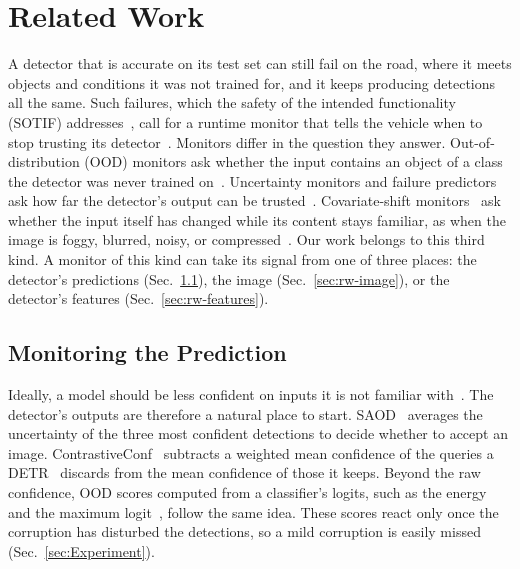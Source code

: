 \section{Related Work}
\label{sec:Related Work}

A detector that is accurate on its test set can still fail on the road, where it meets objects and conditions it was not trained for, and it keeps producing detections all the same. Such failures, which the safety of the intended functionality (SOTIF) addresses~\cite{iso21448}, call for a runtime monitor that tells the vehicle when to stop trusting its detector~\cite{rahman2021survey,yatbaz2024survey}. Monitors differ in the question they answer. Out-of-distribution (OOD) monitors ask whether the input contains an object of a class the detector was never trained on~\cite{du2022vos,du2022siren}. Uncertainty monitors and failure predictors ask how far the detector's output can be trusted~\cite{feng2022review,harakeh2021estimating,rahman2021perframe,yatbaz2024runtime}. Covariate-shift monitors~\cite{yang2024generalized} ask whether the input itself has changed while its content stays familiar, as when the image is foggy, blurred, noisy, or compressed~\cite{hendrycks2019benchmarking,michaelis2019benchmarking}. Our work belongs to this third kind. A monitor of this kind can take its signal from one of three places: the detector's predictions (Sec.~\ref{sec:rw-prediction}), the image (Sec.~\ref{sec:rw-image}), or the detector's features (Sec.~\ref{sec:rw-features}).

\subsection{Monitoring the Prediction}
\label{sec:rw-prediction}
Ideally, a model should be less confident on inputs it is not familiar with~\cite{hendrycks2017baseline}. The detector's outputs are therefore a natural place to start. SAOD~\cite{oksuz2023saod} averages the uncertainty of the three most confident detections to decide whether to accept an image. ContrastiveConf~\cite{park2026uncertainty} subtracts a weighted mean confidence of the queries a DETR~\cite{carion2020detr} discards from the mean confidence of those it keeps. Beyond the raw confidence, OOD scores computed from a classifier's logits, such as the energy~\cite{liu2020energy} and the maximum logit~\cite{hendrycks2022scaling}, follow the same idea. These scores react only once the corruption has disturbed the detections, so a mild corruption is easily missed (Sec.~\ref{sec:Experiment}).

